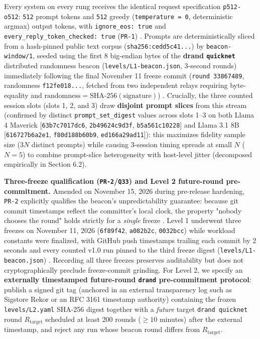 \documentclass[11pt,letterpaper]{article}
\begin{document}
Every system on every rung receives the identical request specification \texttt{p512-\allowbreak{}o512}: \texttt{512} prompt tokens and \texttt{512} greedy (\texttt{temperature = 0}, deterministic argmax) output tokens, with \texttt{ignore\_\allowbreak{}eos: true} and \texttt{every\_\allowbreak{}reply\_\allowbreak{}token\_\allowbreak{}checked: true} (\texttt{PR-1}) \cite{iproofs2026}. Prompts are deterministically sliced from a hash-pinned public text corpus (\texttt{sha256:\allowbreak{}cedd5c41...}) by \texttt{beacon-\allowbreak{}window/\allowbreak{}1}, seeded using the first 8 big-endian bytes of the \textbf{drand \texttt{quicknet}} distributed randomness beacon (\texttt{levels/\allowbreak{}L1-\allowbreak{}beacon.\allowbreak{}json}, 3-second rounds) immediately following the final November 11 freeze commit (\texttt{round 33867489}, randomness \texttt{f12fe018...}, fetched from two independent relays requiring byte-equality and $\text{randomness} = \text{SHA-256}(\text{signature})$) \cite{iproofs2026}. Crucially, the three counted session slots (slots 1, 2, and 3) draw \textbf{disjoint prompt slices} from this stream (confirmed by distinct \texttt{prompt\_\allowbreak{}set\_\allowbreak{}digest} values across slots 1--3 on both Llama 4 Maverick [\texttt{63b7c7017dc6}, \texttt{2b49624c9d3f}, \texttt{b5a561c10228}] and Llama 3.1 8B [\texttt{616727b6a2e1}, \texttt{f80d188b60b9}, \texttt{ed166a29ad11}]): this maximizes fidelity sample size ($3N$ distinct prompts) while causing 3-session timing spreads at small $N$ ($N = 5$) to combine prompt-slice heterogeneity with host-level jitter (decomposed empirically in Section 6.2).

\textbf{Three-freeze qualification (\texttt{PR-2}/\texttt{Q33}) and Level 2 future-round pre-commitment.} Amended on November 15, 2026 during pre-release hardening, \texttt{PR-2} explicitly qualifies the beacon's unpredictability guarantee: because git commit timestamps reflect the committer's local clock, the property "nobody chooses the round" holds strictly for a \textit{single} freeze \cite{iproofs2026}. Level 1 underwent three freezes on November 11, 2026 (\texttt{6f89f42}, \texttt{a082b2c}, \texttt{0032bcc}) while workload constants were finalized, with GitHub push timestamps trailing each commit by 2 seconds and every counted v1.0 run pinned to the third freeze digest (\texttt{levels/\allowbreak{}L1-\allowbreak{}beacon.\allowbreak{}json}) \cite{iproofs2026}. Recording all three freezes preserves auditability but does not cryptographically preclude freeze-commit grinding. For Level 2, we specify an \textbf{externally timestamped future-round \texttt{drand} pre-commitment protocol}: publish a signed git tag (anchored in an external transparency log such as Sigstore Rekor or an RFC 3161 timestamp authority) containing the frozen \texttt{levels/\allowbreak{}L2.\allowbreak{}yaml} SHA-256 digest together with a \textit{future} target \texttt{drand quicknet} round $R_{\text{target}}$ scheduled at least 200 rounds ($\ge 10$ minutes) after the external timestamp, and reject any run whose beacon round differs from $R_{\text{target}}$.
\end{document}
